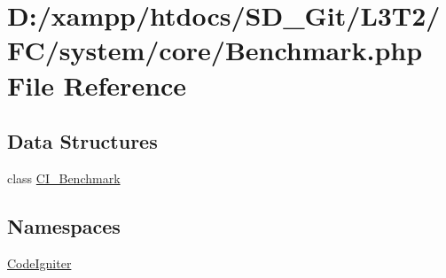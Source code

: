 \hypertarget{system_2core_2_benchmark_8php}{}\section{D\+:/xampp/htdocs/\+S\+D\+\_\+\+Git/\+L3\+T2/\+F\+C/system/core/\+Benchmark.php File Reference}
\label{system_2core_2_benchmark_8php}
\subsection*{Data Structures}
\begin{DoxyCompactItemize}
\item 
class \hyperlink{class_c_i___benchmark}{C\+I\+\_\+\+Benchmark}
\end{DoxyCompactItemize}
\subsection*{Namespaces}
\begin{DoxyCompactItemize}
\item 
 \hyperlink{namespace_code_igniter}{Code\+Igniter}
\end{DoxyCompactItemize}

